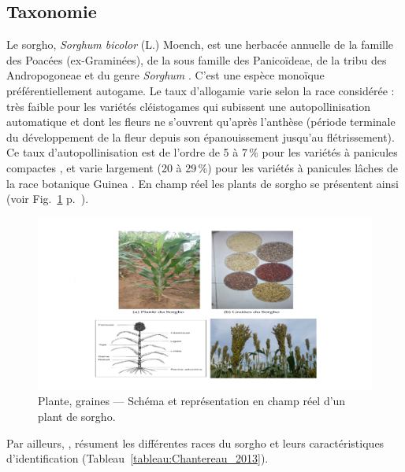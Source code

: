 \documentclass[a4paper,11pt]{article}
\begin{document}
\subsection{Taxonomie}

Le sorgho, \emph{Sorghum bicolor} (L.) Moench, est une herbacée
annuelle de la famille des Poacées (ex-Graminées), de la sous famille
des Panicoïdeae, de la tribu des Andropogoneae et du genre
\emph{Sorghum} \cite{Doggett_1988}. C'est une espèce monoïque
préférentiellement autogame. Le taux d'allogamie varie selon la race
considérée : très faible pour les variétés cléistogames qui subissent
une autopollinisation automatique et dont les fleurs ne s'ouvrent
qu'après l'anthèse (période terminale du développement de la fleur
depuis son épanouissement jusqu'au flétrissement). Ce taux
d'autopollinisation est de l'ordre de 5 à 7\,\% pour les variétés à
panicules compactes \cite{Doggett_1988}, et varie largement (20 à
29\,\%) pour les variétés à panicules lâches de la race botanique
Guinea \cite{Ollitrault_1987,Chantereau_1994}. En champ réel les
plants de sorgho se présentent ainsi (voir
Fig.~\ref{fig-SchemaComposePage5}
p.~\pageref{fig-SchemaComposePage5}).

\begin{figure}
  \begin{center}
    \includegraphics[width=16cm]{images/SchemaComposePage5}
  \end{center}
  \caption{Plante, graines --- Schéma et représentation en champ réel d'un plant de sorgho.}
  \label{fig-SchemaComposePage5}
\end{figure}

Par ailleurs, , résument les différentes
races du sorgho et leurs caractéristiques d'identification
(Tableau~\ref{tableau:Chantereau_2013}).
\end{document}
